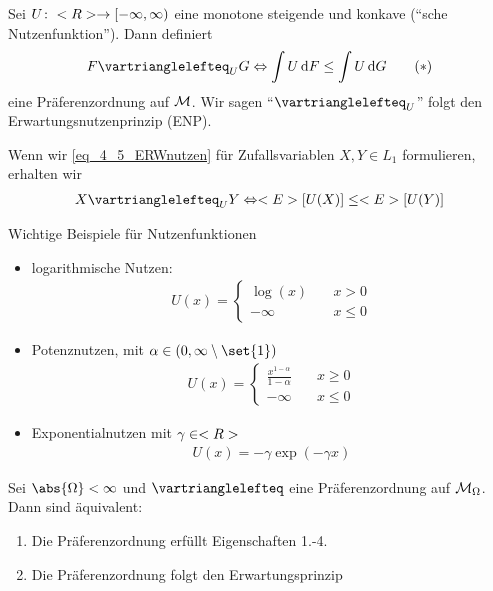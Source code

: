 \begin{definition}[Erwartungsnutzen]
	Sei $U\colon <R> \to [-\infty, \infty)$ eine monotone steigende und konkave (``sche Nutzenfunktion''). Dann definiert
	\begin{align*}
		F \vartrianglelefteq_{U} G \Leftrightarrow \int U \d F \le \int U \d G \tag{$\ast$} \label{eq_4_5_ERWnutzen}
	\end{align*}
	eine Präferenzordnung auf $\mathcal M$. Wir sagen ``$\vartrianglelefteq_U$'' folgt den Erwartungsnutzenprinzip (ENP).
\end{definition}
\begin{*remark}
	Wenn wir \eqref{eq_4_5_ERWnutzen} für Zufallsvariablen $X,Y \in L_1$ formulieren, erhalten wir
		\begin{align*}
			X \vartrianglelefteq_U Y \Leftrightarrow \E[U(X)] \le \E[U(Y)]
		\end{align*}
\end{*remark}
\begin{*example}
	Wichtige Beispiele für Nutzenfunktionen
	\begin{itemize}
		\item logarithmische Nutzen:
		\begin{align*}
			U(x) = \begin{cases}
			\log(x) &\quad x > 0\\
			-\infty &\quad x \le 0
			\end{cases}
		\end{align*}
		\item Potenznutzen, mit $\alpha \in(0,\infty\setminus \set{1})$
		\begin{align*}
			U(x) = \begin{cases}
				\frac{x^{1-\alpha}}{1-\alpha} &\quad x\ge 0\\
				-\infty &\quad x\le 0
			\end{cases}
		\end{align*}
		\item Exponentialnutzen mit $\gamma \in <R>$
		\begin{align*}
			U(x) = -\gamma \exp(-\gamma x)
		\end{align*}
	\end{itemize}
\end{*example}
\begin{theorem} %
	Sei $\abs{\O} < \infty$ und $\vartrianglelefteq$ eine Präferenzordnung auf $\mathcal M_{\Omega}$. Dann sind äquivalent:
	\begin{enumerate}
		\item Die Präferenzordnung erfüllt Eigenschaften 1.-4.
		\item Die Präferenzordnung folgt den Erwartungsprinzip
	\end{enumerate} 
\end{theorem}

